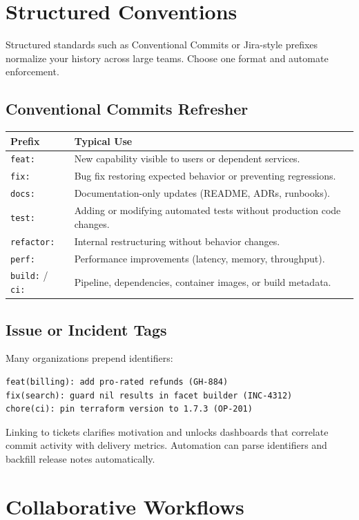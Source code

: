 \section{Structured Conventions}
Structured standards such as Conventional Commits or Jira-style prefixes normalize your history across large teams. Choose one format and automate enforcement.

\subsection{Conventional Commits Refresher}
\begin{longtable}{p{}p{}}
\toprule
\textbf{Prefix} & \textbf{Typical Use} \\
\midrule
\texttt{feat:} & New capability visible to users or dependent services. \\
\texttt{fix:} & Bug fix restoring expected behavior or preventing regressions. \\
\texttt{docs:} & Documentation-only updates (README, ADRs, runbooks). \\
\texttt{test:} & Adding or modifying automated tests without production code changes. \\
\texttt{refactor:} & Internal restructuring without behavior changes. \\
\texttt{perf:} & Performance improvements (latency, memory, throughput). \\
\texttt{build:} / \texttt{ci:} & Pipeline, dependencies, container images, or build metadata. \\
\bottomrule
\end{longtable}

\subsection{Issue or Incident Tags}
Many organizations prepend identifiers:
\begin{lstlisting}[style=markdown,caption={Linking commits to tracking systems}]
feat(billing): add pro-rated refunds (GH-884)
fix(search): guard nil results in facet builder (INC-4312)
chore(ci): pin terraform version to 1.7.3 (OP-201)
\end{lstlisting}

Linking to tickets clarifies motivation and unlocks dashboards that correlate commit activity with delivery metrics. Automation can parse identifiers and backfill release notes automatically.

\section{Collaborative Workflows}
